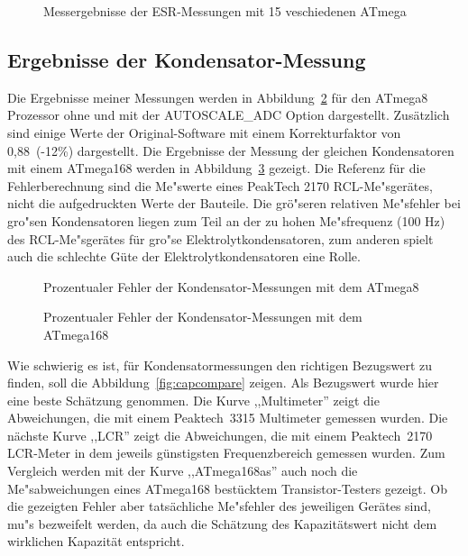 \begin{figure}[H]
\centering

\caption{Messergebnisse der ESR-Messungen mit 15 veschiedenen ATmega}
\label{fig:Cesr}
\end{figure}


\subsection{Ergebnisse der Kondensator-Messung}
Die Ergebnisse meiner Messungen werden in Abbildung~\ref{fig:mega8cap} f\"ur den ATmega8 Prozessor ohne und mit
der AUTOSCALE\_ADC Option dargestellt. Zus\"atzlich sind einige Werte der Original-Software mit einem Korrekturfaktor
von 0,88~(-12\%) dargestellt.
Die Ergebnisse der Messung der gleichen Kondensatoren mit einem ATmega168 werden in Abbildung~\ref{fig:mega168cap} gezeigt.
Die Referenz f\"ur die Fehlerberechnung sind die Me"swerte eines PeakTech 2170 RCL-Me"sger\"ates, 
 nicht die aufgedruckten Werte der Bauteile.
Die gr\"o"seren relativen Me"sfehler bei gro"sen Kondensatoren liegen zum Teil an der zu hohen Me"sfrequenz (100 Hz) des
RCL-Me"sger\"ates f\"ur gro"se Elektrolytkondensatoren, zum anderen spielt auch die schlechte G\"ute der
Elektrolytkondensatoren eine Rolle.

\begin{figure}[H]
\centering

\caption{Prozentualer Fehler der Kondensator-Messungen mit dem ATmega8}
\label{fig:mega8cap}
\end{figure}

\begin{figure}[H]
\centering

\caption{Prozentualer Fehler der Kondensator-Messungen mit dem ATmega168}
\label{fig:mega168cap}
\end{figure}

Wie schwierig es ist, f\"ur Kondensatormessungen den richtigen Bezugswert zu finden, soll die Abbildung~\ref{fig:capcompare} zeigen.
Als Bezugswert wurde hier eine beste Sch\"atzung genommen. Die Kurve ,,Multimeter'' zeigt die Abweichungen, die mit einem
Peaktech~3315 Multimeter gemessen wurden.
Die n\"achste Kurve ,,LCR'' zeigt die Abweichungen, die mit einem Peaktech~2170 LCR-Meter in dem jeweils g\"unstigsten Frequenzbereich gemessen wurden.
Zum Vergleich werden mit der Kurve ,,ATmega168as'' auch noch die Me"sabweichungen eines ATmega168 best\"ucktem Transistor-Testers gezeigt.
Ob die gezeigten Fehler aber tats\"achliche Me"sfehler des jeweiligen Ger\"ates sind, mu"s bezweifelt werden, da auch die
Sch\"atzung des Kapazit\"atswert nicht dem wirklichen Kapazit\"at entspricht.

